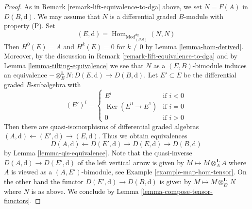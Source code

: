 \documentclass[10pt,a4paper]{amsart}
\theoremstyle{plain}
\theoremstyle{definition}
\theoremstyle{remark}
\numberwithin{equation}{subsection}
\def\Hom{\mathop{\mathrm{Hom}}\nolimits}
\def\Ker{\mathop{\mathrm{Ker}}}
\begin{document}
\begin{proof}
As in Remark \ref{remark-lift-equivalence-to-dga} above, we set $N = F(A)$
in $D(B, \text{d})$. We may assume that $N$ is a differential graded
$B$-module with property (P). Set
$$
(E, \text{d}) = \Hom_{\text{Mod}^{dg}_{(B, \text{d})}}(N, N)
$$
Then $H^0(E) = A$ and $H^k(E) = 0$ for $k \not = 0$ by
Lemma \ref{lemma-hom-derived}.
Moreover, by the discussion in Remark \ref{remark-lift-equivalence-to-dga}
and by Lemma \ref{lemma-tilting-equivalence}
we see that $N$ as a $(E, B)$-bimodule induces an
equivalence $- \otimes_E^\mathbf{L} N : D(E, \text{d}) \to D(B, \text{d})$.
Let $E' \subset E$ be the differential graded $R$-subalgebra
with
$$
(E')^i = \left\{
\begin{matrix}
E^i & \text{if }i < 0 \\
\Ker(E^0 \to E^1) & \text{if }i = 0 \\
0 & \text{if }i > 0
\end{matrix}
\right.
$$
Then there are quasi-isomorphisms of differential graded
algebras $(A, \text{d}) \leftarrow (E', \text{d}) \rightarrow (E, \text{d})$.
Thus we obtain equivalences
$$
D(A, \text{d}) \leftarrow D(E', \text{d}) \rightarrow D(E, \text{d})
\rightarrow D(B, \text{d})
$$
by Lemma \ref{lemma-qis-equivalence}.
Note that the quasi-inverse $D(A, \text{d}) \to D(E', \text{d})$
of the left vertical arrow is given
by $M \mapsto M \otimes_A^\mathbf{L} A$ where $A$ is viewed as a
$(A, E')$-bimodule, see Example \ref{example-map-hom-tensor}.
On the other hand the functor $D(E', \text{d}) \to D(B, \text{d})$ is given by
$M \mapsto M \otimes_{E'}^\mathbf{L} N$ where $N$ is as above.
We conclude by Lemma \ref{lemma-compose-tensor-functors}.
\end{proof}
\end{document}
